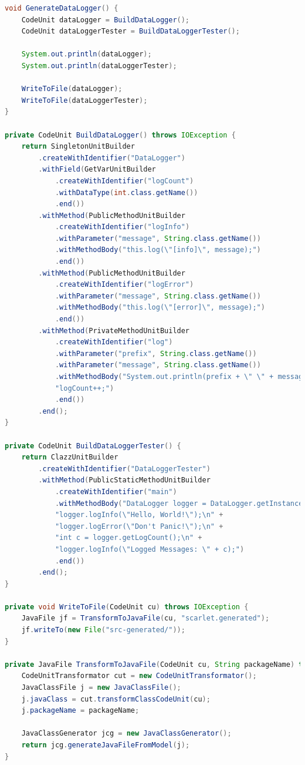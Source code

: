 \documentclass[12pt,oneside,a4paper,parskip]{scrbook}
\begin{document}
\begin{lstlisting}[label=lst:dataloggergen,
language=java,
firstnumber=1,
caption=Quelltext zur Erzeugung des DataLoggers und des zugehörigen Testers.]
void GenerateDataLogger() {
	CodeUnit dataLogger = BuildDataLogger();
	CodeUnit dataLoggerTester = BuildDataLoggerTester();
	
	System.out.println(dataLogger);
	System.out.println(dataLoggerTester);
	
	WriteToFile(dataLogger);
	WriteToFile(dataLoggerTester);
}

private CodeUnit BuildDataLogger() throws IOException {
	return SingletonUnitBuilder
		.createWithIdentifier("DataLogger")
		.withField(GetVarUnitBuilder
			.createWithIdentifier("logCount")
			.withDataType(int.class.getName())
			.end())
		.withMethod(PublicMethodUnitBuilder
			.createWithIdentifier("logInfo")
			.withParameter("message", String.class.getName())
			.withMethodBody("this.log(\"[info]\", message);")
			.end())
		.withMethod(PublicMethodUnitBuilder
			.createWithIdentifier("logError")
			.withParameter("message", String.class.getName())
			.withMethodBody("this.log(\"[error]\", message);")
			.end())
		.withMethod(PrivateMethodUnitBuilder
			.createWithIdentifier("log")
			.withParameter("prefix", String.class.getName())
			.withParameter("message", String.class.getName())
			.withMethodBody("System.out.println(prefix + \" \" + message);\n" +
			"logCount++;")
			.end())
		.end();
}

private CodeUnit BuildDataLoggerTester() {
	return ClazzUnitBuilder
		.createWithIdentifier("DataLoggerTester")
		.withMethod(PublicStaticMethodUnitBuilder
			.createWithIdentifier("main")
			.withMethodBody("DataLogger logger = DataLogger.getInstance();\n" +
			"logger.logInfo(\"Hello, World!\");\n" +
			"logger.logError(\"Don't Panic!\");\n" +
			"int c = logger.getLogCount();\n" +
			"logger.logInfo(\"Logged Messages: \" + c);")
			.end())
		.end();
}

private void WriteToFile(CodeUnit cu) throws IOException {
	JavaFile jf = TransformToJavaFile(cu, "scarlet.generated");
	jf.writeTo(new File("src-generated/"));
}

private JavaFile TransformToJavaFile(CodeUnit cu, String packageName) throws IOException {
	CodeUnitTransformator cut = new CodeUnitTransformator();
	JavaClassFile j = new JavaClassFile();
	j.javaClass = cut.transformClassCodeUnit(cu);
	j.packageName = packageName;
	
	JavaClassGenerator jcg = new JavaClassGenerator();
	return jcg.generateJavaFileFromModel(j);
}
\end{lstlisting}
\end{document}
